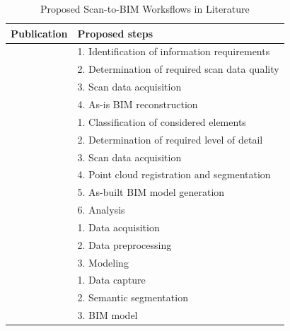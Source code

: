 \begin{table}[h]
    \centering
    \begin{tabular}{p{2cm} p{9cm}}
        \textbf{Publication} & \textbf{Proposed steps} \\
        \hline
        \cite{wangApplicationOrientedScantoBIM2019} & 1. Identification of information requirements \\
                & 2. Determination of required scan data quality \\
                & 3. Scan data acquisition \\
                & 4. As-is BIM reconstruction \\
        \hline
        \cite{badenkoSCANTOBIMMETHODOLOGYADAPTED2019} & 1. Classification of considered elements \\
                & 2. Determination of required level of detail \\
                & 3. Scan data acquisition \\
                & 4. Point cloud registration and segmentation \\
                & 5. As-built BIM model generation \\
                & 6. Analysis \\
        \hline
        \cite{borrusoProceduralPointCloud2023} & 1. Data acquisition \\
                & 2. Data preprocessing \\
                & 3. Modeling \\
        \hline
        \cite{rashdiScanningTechnologiesBuilding2022} & 1. Data capture \\
                & 2. Semantic segmentation \\
                & 3. BIM model \\
    \end{tabular}
    \caption{Proposed Scan-to-BIM Worksflows in Literature}
    \label{tab:scan-to-bim_workflows}
\end{table}


